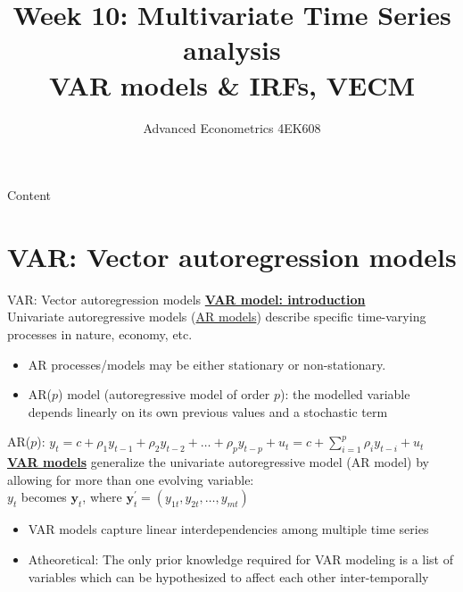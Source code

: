\documentclass[usenames,dvipsnames]{beamer}
\title[Week10]{Week 10: Multivariate Time Series analysis\\ VAR models \& IRFs, VECM}
\author{Advanced Econometrics 4EK608}
\institute{Vysoká škola ekonomická v Praze}
\date{}
\begin{document}
 
\begin{frame}
  \titlepage
\end{frame}

\begin{frame}{Content}
  \tableofcontents
\end{frame}

\section{VAR: Vector autoregression models}
\begin{frame}{VAR: Vector autoregression models}
\footnotesize
\underline{\textbf{VAR model: introduction}}\\
\bigskip
Univariate autoregressive models (\underline{AR models}) describe specific time-varying processes in nature, economy, etc.
\begin{itemize}
\item AR processes/models may be either stationary or non-stationary.
\item AR($p$) model (autoregressive model of order $p$): the modelled variable depends linearly on its own previous values and a stochastic term
\end{itemize}
\medskip
AR($p$): $y_t = c + \rho_1 y_{t-1} + \rho_2 y_{t-2} + \dots + \rho_p y_{t-p} + u_t = c + \sum_{i=1}^p \rho_i y_{t-i} + u_t$ \\
\bigskip
\underline{\textbf{VAR models}} generalize the univariate autoregressive model (AR model) by allowing for more than one evolving variable:\\ $y_t$ becomes $\bm{y}_t$, where $\bm{y}_t^{\prime} = (y_{1t}, y_{2t}, \dots , y_{mt})$\\
\begin{itemize}
\item VAR models capture linear interdependencies among multiple time series 
\item Atheoretical: The only prior knowledge required for VAR modeling is a list of variables which can be hypothesized to affect each other inter-temporally
\end{itemize}
\end{frame}
\end{document}
